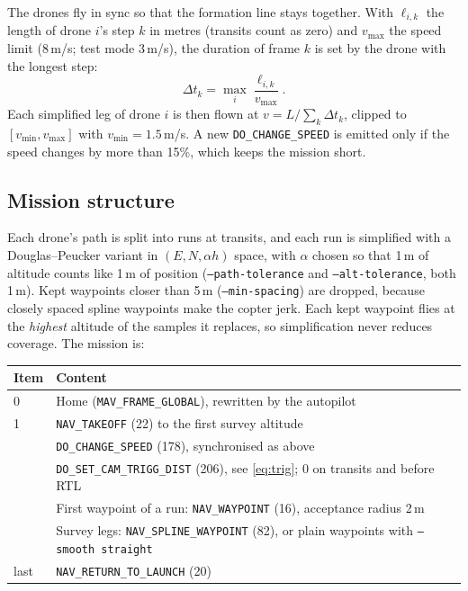 \documentclass[11pt,a4paper]{article}
\newcommand{\code}[1]{\texttt{#1}}
\begin{document}
The drones fly in sync so that the formation line stays together. With $\ell_{i,k}$ the length of drone
$i$'s step $k$ in metres (transits count as zero) and $v_{\max}$ the speed limit (8\,m/s; test mode 3\,m/s),
the duration of frame $k$ is set by the drone with the longest step:
\begin{equation}
\Delta t_k = \max_i \frac{\ell_{i,k}}{v_{\max}} .
\end{equation}
Each simplified leg of drone $i$ is then flown at $v = L/\sum_k\Delta t_k$, clipped to
$[v_{\min}, v_{\max}]$ with $v_{\min}=1.5$\,m/s. A new \code{DO\_CHANGE\_SPEED} is emitted only if the speed
changes by more than 15\%, which keeps the mission short.

\subsection{Mission structure}

Each drone's path is split into runs at transits, and each run is simplified with a Douglas--Peucker
variant in $(E,N,\alpha h)$ space, with $\alpha$ chosen so that 1\,m of altitude counts like 1\,m of
position (\code{--path-tolerance} and \code{--alt-tolerance}, both 1\,m). Kept waypoints closer than 5\,m
(\code{--min-spacing}) are dropped, because closely spaced spline waypoints make the copter jerk. Each
kept waypoint flies at the \emph{highest} altitude of the samples it replaces, so simplification never
reduces coverage. The mission is:

\begin{center}
\begin{tabularx}{\linewidth}{@{}lX@{}}
\toprule
Item & Content \\
\midrule
0 & Home (\code{MAV\_FRAME\_GLOBAL}), rewritten by the autopilot \\
1 & \code{NAV\_TAKEOFF} (22) to the first survey altitude \\
  & \code{DO\_CHANGE\_SPEED} (178), synchronised as above \\
  & \code{DO\_SET\_CAM\_TRIGG\_DIST} (206), see \eqref{eq:trig}; 0 on transits and before RTL \\
  & First waypoint of a run: \code{NAV\_WAYPOINT} (16), acceptance radius 2\,m \\
  & Survey legs: \code{NAV\_SPLINE\_WAYPOINT} (82), or plain waypoints with \code{--smooth straight} \\
last & \code{NAV\_RETURN\_TO\_LAUNCH} (20) \\
\bottomrule
\end{tabularx}
\end{center}
\end{document}
